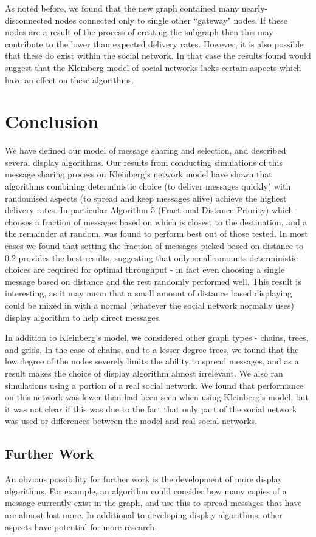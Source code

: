 \documentclass[bsc,frontabs,twoside,singlespacing,parskip,deptreport]{infthesis}     %
\begin{document}
As noted before, we found that the new graph contained many nearly-disconnected nodes connected only to single other ``gateway" nodes. If these nodes are a result of the process of creating the subgraph then this may contribute to the lower than expected delivery rates. However, it is also possible that these do exist within the social network. In that case the results found would suggest that the Kleinberg model of social networks lacks certain aspects which have an effect on these algorithms.

\chapter{Conclusion} \label{chapter5}
We have defined our model of message sharing and selection, and described several display algorithms. Our results from conducting simulations of this message sharing process on Kleinberg's network model have shown that algorithms combining deterministic choice (to deliver messages quickly) with randomised aspects (to spread and keep messages alive) achieve the highest delivery rates. In particular Algorithm 5 (Fractional Distance Priority) which chooses a fraction of messages based on which is closest to the destination, and a the remainder at random, was found to perform best out of those tested. In most cases we found that setting the fraction of messages picked based on distance to 0.2 provides the best results, suggesting that only small amounts deterministic choices are required for optimal throughput - in fact even choosing a single message based on distance and the rest randomly performed well. This result is interesting, as it may mean that a small amount of distance based displaying could be mixed in with a normal (whatever the social network normally uses) display algorithm to help direct messages.

In addition to Kleinberg's model, we considered other graph types - chains, trees, and grids. In the case of chains, and to a lesser degree trees, we found that the low degree of the nodes severely limits the ability to spread messages, and as a result makes the choice of display algorithm almost irrelevant. We also ran simulations using a portion of a real social network. We found that performance on this network was lower than had been seen when using Kleinberg's model, but it was not clear if this was due to the fact that only part of the social network was used or differences between the model and real social networks.

\section{Further Work}
An obvious possibility for further work is the development of more display algorithms. For example, an algorithm could consider how many copies of a message currently exist in the graph, and use this to spread messages that have are almost lost more. In additional to developing display algorithms, other aspects have potential for more research.
\end{document}
